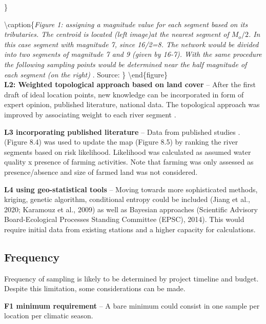 \documentclass[
]{book}
\begin{document}
\}

\textbackslash caption\{\emph{Figure 1: assigning a magnitude value for each segment based on its tributaries. The centroid is located (left image)at the nearest segment of \(M_o/2\). In this case segment with magnitude 7, since 16/2=8. The network would be divided into two segments of magnitude 7 and 9 (given by 16-7). With the same procedure the following sampling points would be determined near the half magnitude of each segment (on the right)} . Source: \citet{Sharp1971}\}\label{fig:sharp01}
\textbackslash end\{figure\}\\

\textbf{L2: Weighted topological approach based on land cover} -- After the first draft of ideal location points, new knowledge can be incorporated in form of expert opinion, published literature, national data. The topological approach was improved by associating weight to each river segment \citep[ ]{Sanders1983, Rajagopal1983}.

\hfill\break

\textbf{L3 incorporating published literature} -- Data from published studies \citep{Akalu2011, Melaku2007, Kassegne2019, Weldegebriel2012}. (Figure 8.4) was used to update the map (Figure 8.5) by ranking the river segments based on risk likelihood. Likelihood was calculated as assumed water quality x presence of farming activities. Note that farming was only assessed as presence/absence and size of farmed land was not considered.

\hfill\break

\textbf{L4 using geo-statistical tools} -- Moving towards more sophisticated methods, kriging, genetic algorithm, conditional entropy could be included (Jiang et al., 2020; Karamouz et al., 2009) as well as Bayesian approaches (Scientific Advisory Board-Ecological Processes Standing Committee (EPSC), 2014). This would require initial data from existing stations and a higher capacity for calculations.

\hypertarget{frequency}{%
\subsection{Frequency}\label{frequency}}

Frequency of sampling is likely to be determined by project timeline and budget. Despite this limitation, some considerations can be made.

\textbf{F1 minimum requirement} -- A bare minimum could consist in one sample per location per climatic season.
\end{document}
